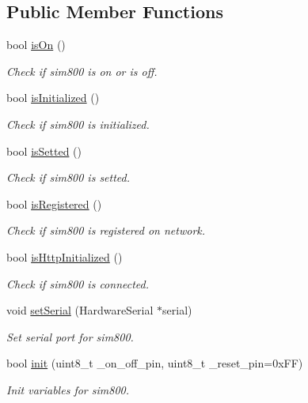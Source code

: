 \subsection*{Public Member Functions}
\begin{DoxyCompactItemize}
\item 
bool \hyperlink{classSIM800_aa021c75801b1918b5ad0fa56069f375c}{is\+On} ()
\begin{DoxyCompactList}\small\item\em Check if sim800 is on or is off. \end{DoxyCompactList}\item 
bool \hyperlink{classSIM800_ad582d1f567623255d8562a8fc01de236}{is\+Initialized} ()
\begin{DoxyCompactList}\small\item\em Check if sim800 is initialized. \end{DoxyCompactList}\item 
bool \hyperlink{classSIM800_a373c14a3362d291f32c8019f072dfe4e}{is\+Setted} ()
\begin{DoxyCompactList}\small\item\em Check if sim800 is setted. \end{DoxyCompactList}\item 
bool \hyperlink{classSIM800_a275fc00e4d607e244c3ce9f6eff032d2}{is\+Registered} ()
\begin{DoxyCompactList}\small\item\em Check if sim800 is registered on network. \end{DoxyCompactList}\item 
bool \hyperlink{classSIM800_aadbaa3d44c842c016d57c28bee6e1d1d}{is\+Http\+Initialized} ()
\begin{DoxyCompactList}\small\item\em Check if sim800 is connected. \end{DoxyCompactList}\item 
void \hyperlink{classSIM800_a4872e1f7377e73315966faff14c675d2}{set\+Serial} (Hardware\+Serial $\ast$serial)
\begin{DoxyCompactList}\small\item\em Set serial port for sim800. \end{DoxyCompactList}\item 
bool \hyperlink{classSIM800_aace0006eac0349e879e0b59395a86bc7}{init} (uint8\+\_\+t \+\_\+on\+\_\+off\+\_\+pin, uint8\+\_\+t \+\_\+reset\+\_\+pin=0x\+F\+F)
\begin{DoxyCompactList}\small\item\em Init variables for sim800. \end{DoxyCompactList}\item 

\end{DoxyCompactItemize}
